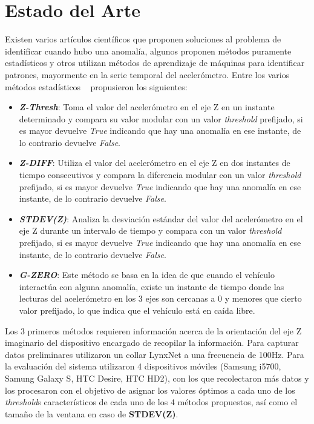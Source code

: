 \chapter{Estado del Arte}\label{chapter:state-of-the-art}

Existen varios artículos científicos que proponen soluciones al problema de identificar cuando hubo una anomalía, algunos proponen métodos
puramente estadísticos y otros utilizan métodos de aprendizaje de máquinas para identificar patrones, mayormente en la serie temporal del
acelerómetro. Entre los varios métodos estadísticos ~\parencite{mednis2011real} propusieron los siguientes:\\

\begin{itemize}
	\item  \emph{\textbf {Z-Thresh}}: Toma el valor del acelerómetro en el eje Z en un instante determinado y compara su valor modular con 
	un valor \emph{threshold} prefijado, si es mayor devuelve \emph{True} indicando que hay una anomalía en ese instante, de lo contrario
	devuelve \emph{False}.\\
	\item \emph{\textbf {Z-DIFF}}: Utiliza el valor del acelerómetro en el eje Z en dos instantes de tiempo consecutivos y compara la
		diferencia modular con un valor \emph{threshold} prefijado, si es mayor devuelve \emph{True} indicando que hay una anomalía en ese
		instante, de lo contrario devuelve \emph{False}.\\
	\item \emph{\textbf {STDEV(Z)}}: Analiza la desviación estándar del valor del acelerómetro en el eje Z durante un intervalo de
		tiempo y compara con un valor \emph{threshold} prefijado, si es mayor devuelve \emph{True} indicando que hay una anomalía en ese
		instante, de lo contrario devuelve \emph{False}.\\ 
	\item \emph{\textbf {G-ZERO}}: Este método se basa en la idea de que cuando el vehículo interactúa con alguna anomalía, existe un
		instante de tiempo donde las lecturas del acelerómetro en los 3 ejes son cercanas a 0 y menores que cierto valor prefijado, lo que
		indica que el vehículo está en caída libre.\\
\end{itemize}

Los 3 primeros métodos requieren información acerca de la orientación del eje Z imaginario del dispositivo encargado de recopilar la información. 
Para capturar datos preliminares utilizaron un collar LynxNet a una frecuencia de 100Hz. Para la evaluación del sistema utilizaron 4 dispositivos
móviles (Samsung i5700, Samung Galaxy S, HTC Desire, HTC HD2), con los que recolectaron más datos y los procesaron con el objetivo de asignar los 
valores óptimos a cada uno de los \emph{threshold}s característicos de cada uno de los 4 métodos propuestos, así como el tamaño de la ventana en caso de 
\textbf {STDEV(Z)}.\\

